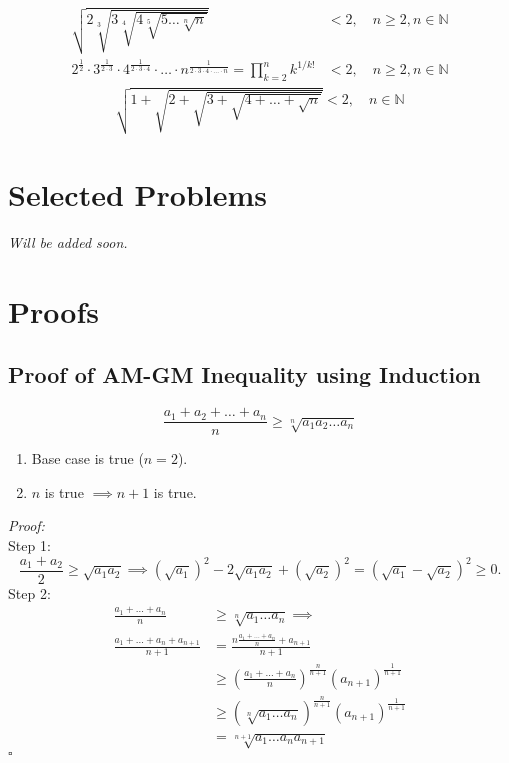\documentclass[a4paper,11pt]{article}
\begin{document}
\begin{equation}
    \begin{aligned}
        \sqrt{2\sqrt[3]{3\sqrt[4]{4\sqrt[5]{5\dots\sqrt[n]{n}}}}} &< 2, \quad n\geq2,n\in\mathbb{N} \\
        2^{\frac{1}{2}} \cdot 3^{\frac{1}{2\cdot3}} \cdot 4^{\frac{1}{2\cdot3\cdot4}} \cdot \ldots \cdot n^{{\frac{1}{2\cdot3\cdot4\cdot\ldots\cdot n}}} = \prod_{k=2}^n k^{1/k!} &< 2, \quad n\geq2,n\in\mathbb{N}
    \end{aligned}
\end{equation}
\vspace{13pt}
\begin{equation}
    \begin{aligned}
        \sqrt{1+\sqrt{2+\sqrt{3+\sqrt{4+\dots+\sqrt{n}}}}} < 2, \quad n\in\mathbb{N}
    \end{aligned}
\end{equation}
\vspace{13pt}


\section{Selected Problems}
\begin{center}
    \textit{Will be added soon.}
\end{center}


\section{Proofs}
\subsection{Proof of AM-GM Inequality using Induction}
\begin{tcolorbox}[breakable]
    \[
    \frac{a_1 + a_2 + \dots + a_n}{n} \geq \sqrt[n]{a_1 a_2 \dots a_n}
    \]
    \begin{enumerate}[label=\roman*.]
        \item Base case is true ($n=2$).
        \item $n$ is true $\implies n+1$ is true.
    \end{enumerate}
    \emph{Proof:} \\[6pt]
    Step 1:
    \[
    \frac{a_1 + a_2}{2} \geq \sqrt{a_1 a_2} \implies (\sqrt{a_1})^2 - 2\sqrt{a_1 a_2} + (\sqrt{a_2})^2 = (\sqrt{a_1} - \sqrt{a_2})^2 \geq 0.
    \]
    Step 2:
    \begin{align*}
        \frac{a_1 + \dots + a_n}{n} &\geq \sqrt[n]{a_1 \dots a_n} \implies\\
        \frac{a_1 + \dots + a_n + a_{n+1}}{n+1} &= \frac{ n \frac{a_1 + \dots + a_n}{n} + a_{n+1}}{n+1} \\  &\geq \left( \frac{a_1 + \dots + a_n}{n} \right)^{\frac{n}{n+1}} (a_{n+1})^{\frac{1}{n+1}} \\
        &\geq \left( \sqrt[n]{a_1 \dots a_n} \right)^{\frac{n}{n+1}} (a_{n+1})^{\frac{1}{n+1}} \\
        &= \sqrt[n+1]{a_1 \dots a_n a_{n+1}} 
    \end{align*}
    \hfill$\square$
\end{tcolorbox}
\end{document}
